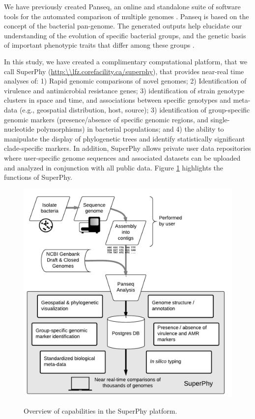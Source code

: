 \documentclass[a4paper,twoside]{article}
\begin{document}
We have previously created Panseq, an online and standalone suite of software tools for the automated comparison of multiple genomes \cite{laing_pan-genome_2010,laing_identification_2011}. Panseq is based on the concept of the bacterial pan-genome. The generated outputs help elucidate our understanding of the evolution of specific bacterial groups, and the genetic basis of important phenotypic traits that differ among these groups \cite{laing_pan-genome_2010}.

In this study, we have created a complimentary computational platform, that we call SuperPhy (\url{http:\\lfz.corefacility.ca/superphy}), that provides near-real time analyses of: 1) Rapid genomic comparisons of novel genomes; 2) Identification of virulence and antimicrobial resistance genes; 3) identification of strain genotype clusters in space and time, and associations between specific genotypes and meta-data (e.g., geospatial distribution, host, source); 3) identification of group-specific genomic markers (presence/absence of specific genomic regions, and single-nucleotide polymorphisms) in bacterial populations; and 4) the ability to manipulate the display of phylogenetic trees and identify statistically significant clade-specific markers. In addition, SuperPhy allows private user data repositories where user-specific genome sequences and associated datasets can be uploaded and analyzed in conjunction with all public data. Figure \ref{fig:capabilities} highlights the functions of SuperPhy.

\begin{figure}[t]
  \vspace{-0.2cm}
  \centering
   {\includegraphics[width=13cm]{capabilities.pdf}}
  \caption{Overview of capabilities in the SuperPhy platform.}
  \label{fig:capabilities}
\end{figure}
\end{document}

